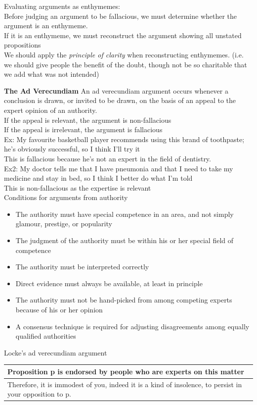 \documentclass[11pt, fleqn]{article}
\begin{document}
Evaluating arguments as enthymemes:\\
Before judging an argument to be fallacious, we must determine whether the argument is an enthymeme.\\
If it is an enthymeme, we must reconstruct the argument showing all unstated propositions\\
We should apply the \textit{principle of clarity} when reconstructing enthymemes. (i.e. we should give people the benefit of the doubt, though not be so charitable that we add what was not intended)

\textbf{The Ad Verecundiam}
An ad verecundiam argument occurs whenever a conclusion is drawn, or invited to be drawn, on the basis of an appeal to the expert opinion of an authority.\\
If the appeal is relevant, the argument is non-fallacious\\
If the appeal is irrelevant, the argument is fallacious\\

Ex: My favourite basketball player recommends using this brand of toothpaste; he's obviously successful, so I think I'll try it\\

This is fallacious because he's not an expert in the field of dentistry.\\

Ex2: My doctor tells me that I have pneumonia and that I need to take my medicine and stay in bed, so I think I better do what I'm told\\

This is non-fallacious as the expertise is relevant\\

Conditions for arguments from authority\\
\begin{itemize}
    \item The authority must have special competence in an area, and not simply glamour, prestige, or popularity
    \item The judgment of the authority must be within his or her special field of competence
    \item The authority must be interpreted correctly
    \item Direct evidence must always be available, at least in principle
    \item The authority must not be hand-picked from among competing experts because of his or her opinion
    \item A consensus technique is required for adjusting disagreements among equally qualified authorities
\end{itemize}
Locke's ad verecundiam argument\\
\begin{tabular}{p{16cm}}
    Proposition p is endorsed by people who are experts on this matter\\
    \hline
    Therefore, it is immodest of you, indeed it is a kind of insolence, to persist in your opposition to p.
\end{tabular}\\
\end{document}
